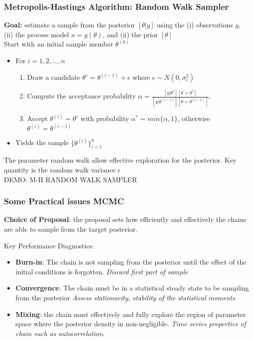 \documentclass{beamer}
\renewcommand{\bf}{\bfseries}
\begin{document}
\frame
{ \frametitle{Metropolis-Hastings Algorithm: Random Walk Sampler}

\small 
\textbf{Goal:} estimate a sample from the posterior $[\theta | y]$ using the (i) observations $y$, (ii) the process model $x = g(\theta)$, and (ii) the prior $[ \theta ]$ \\ 
Start with an initial sample member $\theta^{(0)} $ 
\begin{itemize}	
		\item For $i=1,2,\dots,n$
		\begin{enumerate}
			\item Draw a candidate $\theta^c=\theta^{(i-1)} + \epsilon$ where $\epsilon \sim N(0,\sigma_\epsilon^2)$
			\item Compute the acceptance probability $\alpha= \frac{[y|\theta^c] [\theta = \theta^c]}{[y|\theta^{(i-1)}] [\theta = \theta^{(i-1)}]  } $. 
			\item Accept $\theta^{(i)} = \theta^c$ with probability $\alpha^*=min\{\alpha,1\}$, otherwise $\theta^{(i)} = \theta^{(i-1)}$
		\end{enumerate} 
		\item Yields the sample $ \{ \theta^{(i)} \}_{i=1}^n $ 
\end{itemize}

The parameter random walk allow effective exploration for the posterior. Key quantity is the random walk variance $\epsilon$ \\
\medskip
\color{red} DEMO: M-H RANDOM WALK SAMPLER
}


\frame
{ \frametitle{Some Practical issues MCMC}


{\bf Choice of Proposal}: the proposal sets how efficiently and effectively the chains are able to sample from the target posterior. 


\bigskip
Key Performance Diagnostics:
\begin{itemize}
\item
{\bf Burn-in}: The chain is not sampling from the posterior until the effect of the initial conditions is forgotten. {\it Discard first part of sample}

\item
{\bf Convergence}: The chain must be in a statistical steady state to be sampling from the posterior {\it Assess stationarity, stability of the statistical moments}

\item
{\bf Mixing}: the chain must effectively and fully explore the region of parameter space where the posterior density in non-negligible. {\it Time series properties of chain such as autocorrelation}.

\end{itemize}

}



\end{document}
